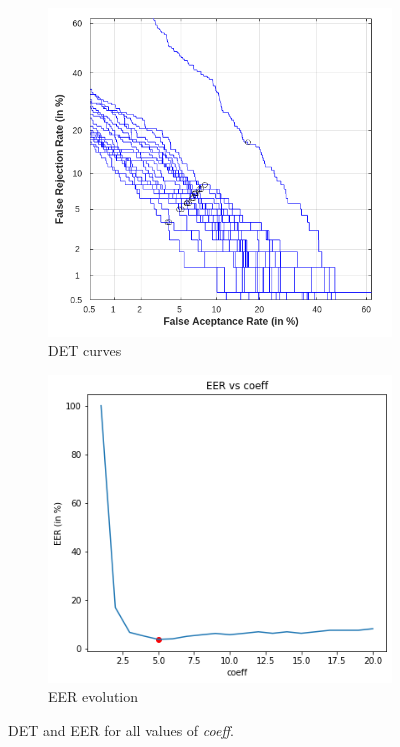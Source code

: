 \documentclass[11pt]{article}
\begin{document}
\begin{figure}[h!]
  \centering
       \begin{subfigure}[t]{0.4\textwidth}
         \centering
         \includegraphics[scale=0.35]{img/1c_det_all}
         \caption{DET curves}
     \end{subfigure}%
     \quad \quad
     \begin{subfigure}[t]{0.4\textwidth}
         \centering
         \includegraphics[scale=0.525]{img/1c_eer_evol}
         \caption{EER evolution}
     \end{subfigure}
    \caption{DET and EER for all values of \textit{coeff}.}
    \label{fig:ex1c_bis}
\end{figure}
\end{document}
